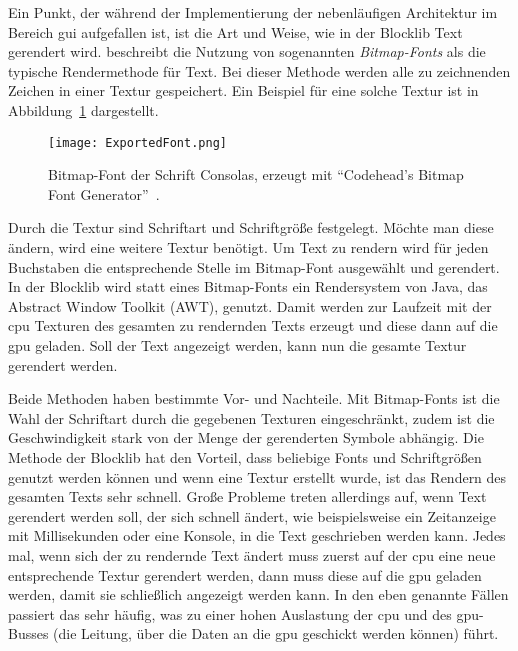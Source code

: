 Ein Punkt, der während der Implementierung der nebenläufigen Architektur im Bereich \ac{gui} aufgefallen ist, ist die Art und Weise, wie in der Blocklib Text gerendert wird. \textcite{Vries2020} beschreibt die Nutzung von sogenannten \emph{Bitmap-Fonts} als die typische Rendermethode für Text. Bei dieser Methode werden alle zu zeichnenden Zeichen in einer Textur gespeichert. Ein Beispiel für eine solche Textur ist in Abbildung~\ref{fig:bitmapfont} dargestellt.
\begin{figure}[!htbp]
	\centering
	\texttt{[image: ExportedFont.png]}
	\caption[Bitmap-Font der Schrift Consolas.]{Bitmap-Font der Schrift Consolas, erzeugt mit \enquote{Codehead's Bitmap Font Generator}~\cite{Codehead2015}.}\label{fig:bitmapfont}
\end{figure}
Durch die Textur sind Schriftart und Schriftgröße festgelegt. Möchte man diese ändern, wird eine weitere Textur benötigt. Um Text zu rendern wird für jeden Buchstaben die entsprechende Stelle im Bitmap-Font ausgewählt und gerendert. In der Blocklib wird statt eines Bitmap-Fonts ein Rendersystem von Java, das Abstract Window Toolkit (AWT), genutzt. Damit werden zur Laufzeit mit der \ac{cpu} Texturen des gesamten zu rendernden Texts erzeugt und diese dann auf die \ac{gpu} geladen. Soll der Text angezeigt werden, kann nun die gesamte Textur gerendert werden.

Beide Methoden haben bestimmte Vor- und Nachteile. Mit Bitmap-Fonts ist die Wahl der Schriftart durch die gegebenen Texturen eingeschränkt, zudem ist die Geschwindigkeit stark von der Menge der gerenderten Symbole abhängig. Die Methode der Blocklib hat den Vorteil, dass beliebige Fonts und Schriftgrößen genutzt werden können und wenn eine Textur erstellt wurde, ist das Rendern des gesamten Texts sehr schnell. Große Probleme treten allerdings auf, wenn Text gerendert werden soll, der sich schnell ändert, wie beispielsweise ein Zeitanzeige mit Millisekunden oder eine Konsole, in die Text geschrieben werden kann. Jedes mal, wenn sich der zu rendernde Text ändert muss zuerst auf der \ac{cpu} eine neue entsprechende Textur gerendert werden, dann muss diese auf die \ac{gpu} geladen werden, damit sie schließlich angezeigt werden kann. In den eben genannte Fällen passiert das sehr häufig, was zu einer hohen Auslastung der \ac{cpu} und des \ac{gpu}-Busses (die Leitung, über die Daten an die \ac{gpu} geschickt werden können) führt.

